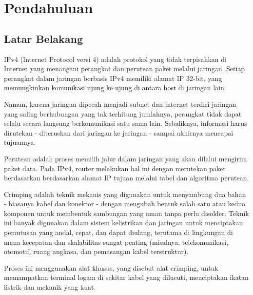 \section{Pendahuluan}
\subsection{Latar Belakang}
IPv4 (Internet Protocol versi 4) adalah protokol yang tidak terpisahkan di 
Internet yang menangani perangkat dan perutean paket melalui jaringan. 
Setiap perangkat dalam jaringan berbasis IPv4 memiliki alamat IP 32-bit, 
yang memungkinkan komunikasi ujung ke ujung di antara host di jaringan lain.

Namun, karena jaringan dipecah menjadi subnet dan internet terdiri jaringan 
yang saling berhubungan yang tak terhitung jumlahnya, perangkat tidak dapat 
selalu secara langsung berkomunikasi satu sama lain. Sebaliknya, informasi 
harus dirutekan - diteruskan dari jaringan ke jaringan - sampai akhirnya 
mencapai tujuannya.

Perutean adalah proses memilih jalur dalam jaringan yang akan dilalui 
mengirim paket data. Pada IPv4, router melakukan hal ini dengan merutekan 
paket berdasarkan berdasarkan alamat IP tujuan melalui tabel dan algoritma 
perutean.

Crimping adalah teknik mekanis yang digunakan untuk menyambung dua bahan - 
biasanya kabel dan konektor - dengan mengubah bentuk salah satu atau kedua 
komponen untuk membentuk sambungan yang aman tanpa perlu disolder. Teknik 
ini banyak digunakan dalam sistem kelistrikan dan jaringan untuk menciptakan 
pemutusan yang andal, cepat, dan dapat diulang, terutama di lingkungan di 
mana kecepatan dan skalabilitas sangat penting (misalnya, telekomunikasi, 
otomotif, ruang angkasa, dan pemasangan kabel terstruktur).

Proses ini menggunakan alat khusus, yang disebut alat crimping, untuk 
memampatkan terminal logam di sekitar kabel yang dilucuti, menciptakan 
ikatan listrik dan mekanik yang kuat.
